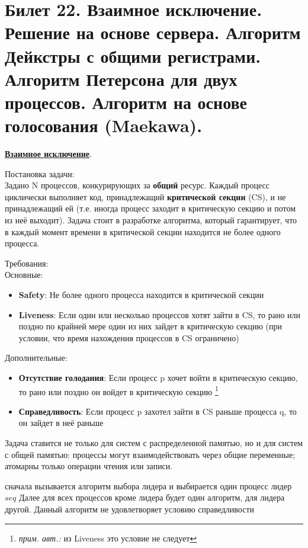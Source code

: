 \newpage
\section {Билет 22. Взаимное исключение. Решение на основе сервера. Алгоритм Дейкстры с общими регистрами. Алгоритм Петерсона для двух процессов. Алгоритм на основе голосования (Maekawa).}
\hyperlink{b_22_link}{\textbf{Взаимное исключение}}.

Постановка задачи: \\
Задано N процессов, конкурирующих за \textbf{общий} ресурс. Каждый процесс циклически выполняет код, принадлежащий \textbf{критической секции} (CS), и не принадлежащий ей (т.е. иногда процесс заходит в критическую секцию и потом из неё выходит).
Задача стоит в разработке алгоритма, который гарантирует, что в каждый момент времени в критической секции находится не более одного процесса.

Требования: \\
Основные:
\begin{itemize}
\item \textbf{Safety}: Не более одного процесса находится в критической секции
\item \textbf{Liveness}: Если один или несколько процессов хотят зайти в CS, то рано или поздно по крайней мере один из них зайдет в критическую секцию (при условии, что время нахождения процессов в CS ограничено)
\end{itemize}
Дополнительные:
\begin{itemize}
\item \textbf{Отсутствие голодания}: Если процесс p хочет войти в критическую секцию, то рано или поздно он войдет в критическую секцию \footnote{\textit{прим. авт.:} из Liveness это условие не следует} 
\item \textbf{Справедливость}: Если процесс p захотел зайти в CS раньше процесса q, то он зайдет в неё раньше
\end{itemize}

Задача ставится не только для систем с распределенной памятью, но и для систем с общей памятью: процессы могут взаимодействовать через общие переменные; атомарны только операции чтения или записи.

 сначала вызывается алгоритм выбора лидера и выбирается один процесс лидер $seq$
Далее для всех процессов кроме лидера будет один алгоритм, для лидера другой. Данный алгоритм не удовлетворяет условию справедливости

